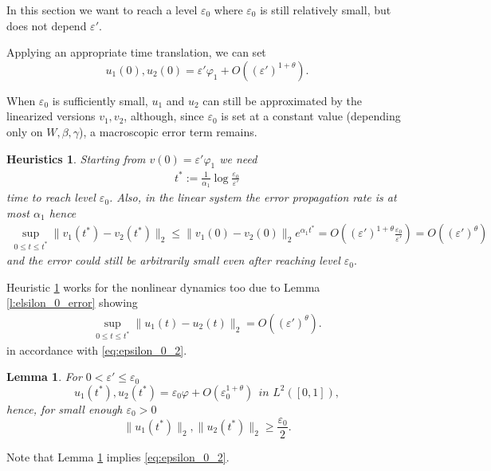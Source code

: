 \documentclass{article}
\newcommand{\1}[1]{{\mathds{1}}_{\left\{#1\right\}}}
\newtheorem{lemma}{Lemma}
\newtheorem{heuristics}{Heuristics}
\begin{document}
In this section we want to reach a level $\varepsilon_0$ where $\varepsilon_0$ is still relatively small, but  does not depend $\varepsilon'$.

Applying an appropriate time translation, we can set
$$
u_1(0), u_2(0)=\varepsilon'\varphi_1+O\left( (\varepsilon')^{1+\theta}\right).
$$

When $\varepsilon_0$ is sufficiently small, $u_1$ and $u_2$ can still be approximated by the linearized versions $v_1,v_2$, although, since $\varepsilon_0$ is set at a constant value (depending only on $W,\beta,\gamma$), a macroscopic error term remains.


\begin{heuristics}
\label{h:error_prop}
Starting from $v(0)=\varepsilon' \varphi_1$ we need
\begin{align}
	\label{eq:t*}
	t^*:=\frac{1}{\alpha_1}\log \frac{\varepsilon_0}{\varepsilon'}
\end{align}
time to reach level $\varepsilon_0$. Also, in the linear system the error propagation rate is at most $\alpha_1$ hence
\begin{align*}
	\sup_{0 \leq t \leq t^*}\|v_1(t^*)-v_2(t^*) \|_2 \leq \|v_1(0)-v_2(0) \|_2e^{\alpha_1 t^*}=O\left((\varepsilon')^{1+\theta} \frac{\varepsilon_0}{\varepsilon'}\right)=O\left((\varepsilon')^{\theta} \right)
\end{align*}
and the error could still be arbitrarily small even after reaching level $\varepsilon_0.$
\end{heuristics}


Heuristic \ref{h:error_prop} works for the nonlinear dynamics too due to Lemma \ref{l:elsilon_0_error} showing
\begin{align*}
	\sup_{0 \leq t \leq t^*} \|u_1(t)-u_2(t) \|_2=O \left((\varepsilon')^{\theta} \right).	
\end{align*}
in accordance with \eqref{eq:epsilon_0_2}.

\begin{lemma}
\label{l:epsilon_0_level}
For  $0<\varepsilon' \leq \varepsilon_0$
$$u_1(t^*),u_2(t^*)=\varepsilon_0 \varphi+O\left(\varepsilon_0^{1+\theta} \right) \ \ \textit{in } L^2([0,1]), $$
hence, for small enough $\varepsilon_0>0$ 
$$\|u_1(t^*) \|_2, \|u_2(t^*) \|_2 \geq \frac{\varepsilon_0}{2}. $$
\end{lemma}

Note that Lemma \ref{l:epsilon_0_level} implies \eqref{eq:epsilon_0_2}.
\end{document}
